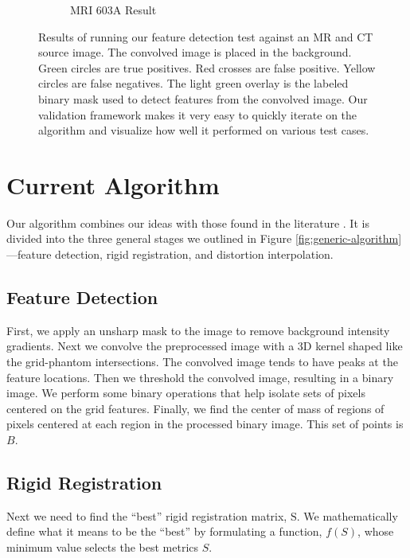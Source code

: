 \documentclass[12pt]{article}
\begin{document}
\begin{figure}
\begin{subfigure}[b]{0.48\textwidth}
        \caption{MRI 603A Result}
        \label{fig:testing-feature-detection_2}
    \end{subfigure}
    \caption{Results of running our feature detection test against an MR and CT source image.  The convolved image is placed in the background.  Green circles are true positives.  Red crosses are false positive.  Yellow circles are false negatives.  The light green overlay is the labeled binary mask used to detect features from the convolved image.  Our validation framework makes it very easy to quickly iterate on the algorithm and visualize how well it performed on various test cases.}
    \label{fig:feature-detection-run}
\end{figure}

\section{Current Algorithm}

Our algorithm combines our ideas with those found in the literature \cite{stanescu2010,baldwin2007}.  It is divided into the three general stages we outlined in Figure \ref{fig:generic-algorithm}---feature detection, rigid registration, and distortion interpolation.

\subsection{Feature Detection}

First, we apply an unsharp mask to the image to remove background intensity gradients.  Next we convolve the preprocessed image with a 3D kernel shaped like the grid-phantom intersections.  The convolved image tends to have peaks at the feature locations.  Then we threshold the convolved image, resulting in a binary image.  We perform some binary operations that help isolate sets of pixels centered on the grid features.  Finally, we find the center of mass of regions of pixels centered at each region in the processed binary image.  This set of points is $B$.

\subsection{Rigid Registration}

Next we need to find the ``best'' rigid registration matrix, $\textrm{S}$.  We mathematically define what it means to be the ``best'' by formulating a function, $f(S)$, whose minimum value selects the best metrics $S$.
\end{document}
